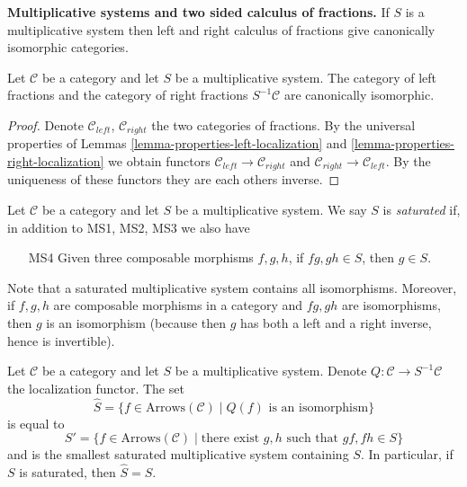 \noindent
{\bf Multiplicative systems and two sided calculus of fractions.}
If $S$ is a multiplicative system then left and right calculus of
fractions give canonically isomorphic categories.

\begin{lemma}
\label{lemma-multiplicative-system}
Let $\mathcal{C}$ be a category and let $S$ be a multiplicative system.
The category of left fractions and the category of right fractions
$S^{-1}\mathcal{C}$ are canonically isomorphic.
\end{lemma}

\begin{proof}
Denote $\mathcal{C}_{left}$, $\mathcal{C}_{right}$ the two categories
of fractions. By the universal properties of
Lemmas \ref{lemma-properties-left-localization} and
\ref{lemma-properties-right-localization}
we obtain functors $\mathcal{C}_{left} \to \mathcal{C}_{right}$
and $\mathcal{C}_{right} \to \mathcal{C}_{left}$.
By the uniqueness of these functors they are each others inverse.
\end{proof}

\begin{definition}
\label{definition-saturated-multiplicative-system}
Let $\mathcal{C}$ be a category and let $S$ be a multiplicative system.
We say $S$ is {\it saturated} if, in addition to MS1, MS2, MS3 we
also have
\begin{enumerate}
\item[MS4] Given three composable morphisms $f, g, h$, if
$fg, gh \in S$, then $g \in S$.
\end{enumerate}
\end{definition}

\noindent
Note that a saturated multiplicative system contains all isomorphisms.
Moreover, if  $f, g, h$ are composable morphisms in a category and
$fg, gh$ are isomorphisms, then $g$ is an isomorphism (because then $g$
has both a left and a right inverse, hence is invertible).

\begin{lemma}
\label{lemma-what-gets-inverted}
Let $\mathcal{C}$ be a category and let $S$ be a multiplicative system.
Denote $Q : \mathcal{C} \to S^{-1}\mathcal{C}$ the localization functor.
The set
$$
\hat S = \{f \in \text{Arrows}(\mathcal{C}) \mid
Q(f) \text{ is an isomorphism}\}
$$
is equal to
$$
S' = \{f \in \text{Arrows}(\mathcal{C}) \mid
\text{there exist }g, h\text{ such that }gf, fh \in S\}
$$
and is the smallest saturated multiplicative system containing $S$.
In particular, if $S$ is saturated, then $\hat S = S$.
\end{lemma}


